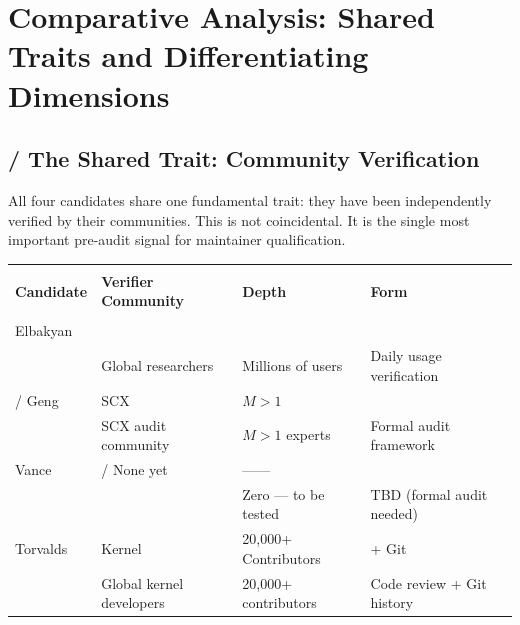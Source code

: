 \documentclass[12pt,a4paper]{article}
\theoremstyle{remark}
\begin{document}
\section{}
\section{Comparative Analysis: Shared Traits and Differentiating Dimensions}

\subsection{ / The Shared Trait: Community Verification}

All four candidates share one fundamental trait: they have been independently
verified by their communities. This is not coincidental. It is the single most
important pre-audit signal for maintainer qualification.

\begin{center}
\begin{longtable}{p{} p{} p{} p{}}
\toprule
\textbf{} & \textbf{} & \textbf{} & \textbf{} \\
\textbf{Candidate} & \textbf{Verifier Community} & \textbf{Depth} & \textbf{Form} \\
\midrule
\endfirsthead
\toprule
\textbf{} & \textbf{} & \textbf{} & \textbf{} \\
\midrule
\endhead
\bottomrule
\endfoot
\midrule
Elbakyan &  &  &  \\
& Global researchers & Millions of users & Daily usage verification \\
\midrule
 / Geng & SCX & $M>1$ &  \\
& SCX audit community & $M>1$ experts & Formal audit framework \\
\midrule
Vance &  / None yet & —— &  \\
& & Zero — to be tested & TBD (formal audit needed) \\
\midrule
Torvalds & Kernel & 20,000+ Contributors &  + Git \\
& Global kernel developers & 20,000+ contributors & Code review + Git history \\
\bottomrule
\end{longtable}
\end{center}
\end{document}
